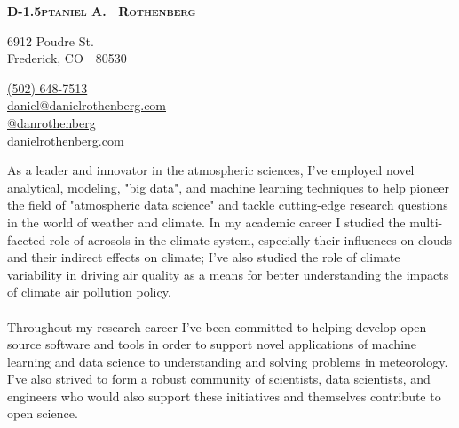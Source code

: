 \documentclass[11pt,letterpaper]{article}
\makeatletter
\def\myemail{daniel@danielrothenberg.com}
\def\mytwitter{danrothenberg}
\def\mywebsite{http://www.danielrothenberg.com}
\def\mywebsiteshort{danielrothenberg.com}
\def\myphone{(502) 648-7513}
\newcommand{\mhead}[1]{\leavevmode\marginpar{\sffamily\footnotesize #1}}
\makeatother
\begin{document}
\pagestyle{fancy} \setlength\headwidth{6.5in}
 \cfoot{}
\thispagestyle{empty}
\begin{adjustwidth}{-1in}{}
{\Large\textbf{
  {\textsc{%
    {D}\kern-1.5ptaniel
    {A}\kern-2pt.~%
    {R}othenberg}
  }
 }
}
\hfill\hfill\hfill
{\small
  \begin{minipage}[b]{1.5in}
    \flushleft \footnotesize
    6912 Poudre St. \\
    Frederick, CO~~80530
  \end{minipage}
  \hfill
  \begin{minipage}[b]{1.9in}
    \flushright \footnotesize
    \href{tel:\myphone}{\myphone}~\faPhone \\
    \href{mailto:\myemail}{\myemail} ~\faEnvelope \\
    \href{https://www.twitter.com/\mytwitter}{@\mytwitter} ~\faTwitter \\
    \href{\mywebsite}{\mywebsiteshort} ~\faGlobe %
  \end{minipage}
}\par
\hrulefill
\end{adjustwidth}
\reversemarginpar
\setlength\marginparwidth{0.85in}




\mhead{Research \newline Interests}

As a leader and innovator in the atmospheric sciences, I've employed novel
analytical, modeling, "big data", and machine learning techniques to help
pioneer the field of "atmospheric data science" and tackle cutting-edge
research questions in the world of weather and climate. In my academic 
career I studied the multi-faceted role of aerosols in the climate system,
especially their influences on clouds and their indirect effects on climate;
I've also studied the role of climate variability in driving air quality 
as a means for better understanding the impacts of climate air pollution 
policy. \\ \\
Throughout my research career I've been committed to helping develop open 
source software and tools in order to support novel applications of machine
learning and data science to understanding and solving problems in meteorology.
I've also strived to form a robust community of scientists, data scientists,
and engineers who would also support these initiatives and themselves 
contribute to open science.
\end{document}

